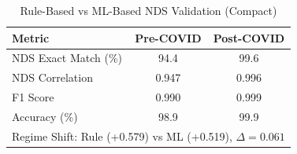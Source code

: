 
\begin{table}[htbp]
\centering
\caption{Rule-Based vs ML-Based NDS Validation (Compact)}
\label{tab:rule_ml_compact}
\small
\begin{tabular}{@{}lcc@{}}
\toprule
\textbf{Metric} & \textbf{Pre-COVID} & \textbf{Post-COVID} \\
\midrule
NDS Exact Match (\%) & 94.4 & 99.6 \\
NDS Correlation & 0.947 & 0.996 \\
F1 Score & 0.990 & 0.999 \\
Accuracy (\%) & 98.9 & 99.9 \\
\midrule
\multicolumn{3}{l}{Regime Shift: Rule (+0.579) vs ML (+0.519), $\Delta = 0.061$} \\
\bottomrule
\end{tabular}
\end{table}


%
%
%
%
%
%
%
%
%
